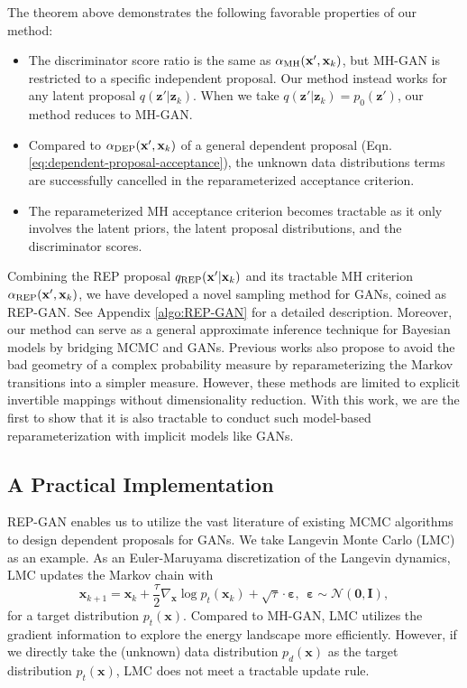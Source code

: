 \documentclass[runningheads]{llncs}
\newcommand{\bx}{\mathbf{x}}
\newcommand{\bz}{\mathbf{z}}
\newcommand{\bI}{\mathbf{I}}
\newcommand{\bvarepsilon}{\bm{\varepsilon}}
\newcommand{\cN}{\mathcal{N}}
\newcommand{\bzero}{\mathbf{0}}
\newcommand{\<}{\left\langle}
\renewcommand{\>}{\right\rangle}
\begin{document}
The theorem above demonstrates the following favorable properties of our method:
\begin{itemize}
\item The discriminator score ratio is the same as $\alpha_{\rm MH}(\bx',\bx_k)$, but MH-GAN is restricted to a specific independent proposal. Our method instead works for any latent proposal $q(\bz'|\bz_k)$. When we take $q(\bz'|\bz_k)=p_0(\bz')$, our method reduces to MH-GAN. 
\item Compared to $\alpha_{\rm DEP}(\bx',\bx_k)$ of a general dependent proposal (Eqn. \eqref{eq:dependent-proposal-acceptance}), the unknown data distributions terms are successfully cancelled in the reparameterized acceptance criterion.
\item The reparameterized MH acceptance criterion becomes tractable as it only involves the latent priors, the latent proposal distributions, and the discriminator scores.
\end{itemize}

Combining the REP proposal $q_{\rm REP}(\bx'|\bx_k)$ and its tractable MH criterion $\alpha_{\rm REP}(\bx',\bx_k)$, we have developed a novel sampling method for GANs, coined as REP-GAN. See Appendix \ref{algo:REP-GAN} for a detailed description.
Moreover, our method can serve as a general approximate inference technique for Bayesian models by bridging MCMC and GANs. Previous works \cite{marzouk2016introduction,titsias2017learning,hoffman2019neutra} also propose to avoid the bad geometry of a complex probability measure by reparameterizing the Markov transitions into a simpler measure. However, these methods are limited to explicit invertible mappings without dimensionality reduction. With this work, we are the first to show that it is also tractable to conduct such model-based reparameterization with implicit models like GANs. 



\subsection{A Practical Implementation}
\label{sec:proposal}
REP-GAN enables us to utilize the vast literature of existing MCMC algorithms \cite{neal2010MCMC} to design dependent proposals for GANs. We take Langevin Monte Carlo (LMC) as an example.
As an Euler-Maruyama discretization of the Langevin dynamics, LMC updates the Markov chain with
\begin{equation}
    \bx_{k+1}=\bx_k+\frac{\tau}{2}\nabla_{\bx}\log p_t(\bx_k)+\sqrt{\tau}\cdot\bvarepsilon,~~\bvarepsilon\sim\cN(\bzero,\bI),
    \label{eqn:langevin-steps}
\end{equation}
for a target distribution $p_t(\bx)$. Compared to MH-GAN, LMC utilizes the gradient information to explore the energy landscape more efficiently. However, if we directly take the (unknown) data distribution $p_d(\bx)$ as the target distribution $p_t(\bx)$, LMC does not meet a tractable update rule. 
\end{document}

